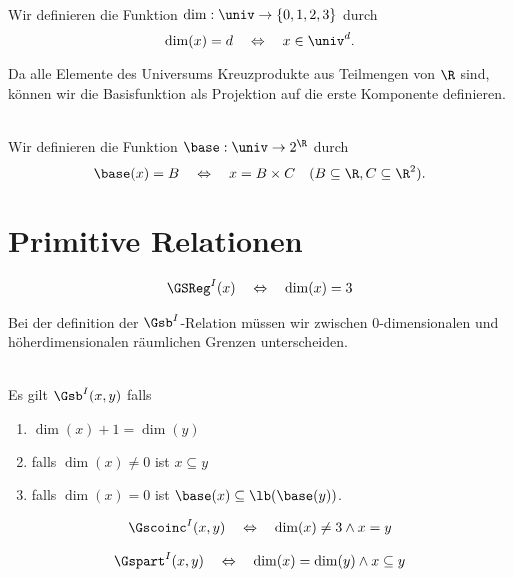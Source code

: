 \begin{dfn}[Dimension]\ \\
    Wir definieren die Funktion $\dim: \univ \to \{0,1,2,3\}$ durch
    $$\dim(x) = d \quad \Leftrightarrow \quad x \in \univ^d.$$
\end{dfn}

Da alle Elemente des Universums Kreuzprodukte aus Teilmengen von $\R$ sind, können wir die Basisfunktion als Projektion auf die erste Komponente definieren.
\begin{dfn}[Basisfunktion]\ \\
    Wir definieren die Funktion $\base : \univ \to 2^\R$ durch
    $$\base (x) = B \quad \Leftrightarrow \quad x = B \times C \quad (B \subseteq \R, C \subseteq \R^2).$$
\end{dfn}



\section{Primitive Relationen}

\begin{dfn}[Raumregionen]
    \begin{align*}
        \GSReg^I(x) \quad \Leftrightarrow \quad \dim(x) = 3
    \end{align*}
\end{dfn}

Bei der definition der $\Gsb^I$-Relation müssen wir zwischen 0-dimensionalen und höherdimensionalen räumlichen Grenzen unterscheiden.
\begin{dfn}\ \\
    Es gilt $\Gsb^I(x,y)$ falls
    \begin{enumerate}
        \item $\dim(x)+1 = \dim(y)$
        \item falls $\dim(x) \neq 0$ ist $x \subseteq y$
        \item falls $\dim(x) = 0$ ist $\base(x) \subseteq \lb(\base(y))$.
    \end{enumerate}
\end{dfn}

\begin{dfn}[Koinzidenz]
    \begin{align*}
        \Gscoinc^I(x,y) \quad \Leftrightarrow \quad \dim(x) \neq 3 \land x=y
    \end{align*}
\end{dfn}

\begin{dfn}[Teil]
    \begin{align*}
        \Gspart^I(x,y) \quad \Leftrightarrow \quad \dim(x) = \dim(y) \land x \subseteq y
    \end{align*}
\end{dfn}



